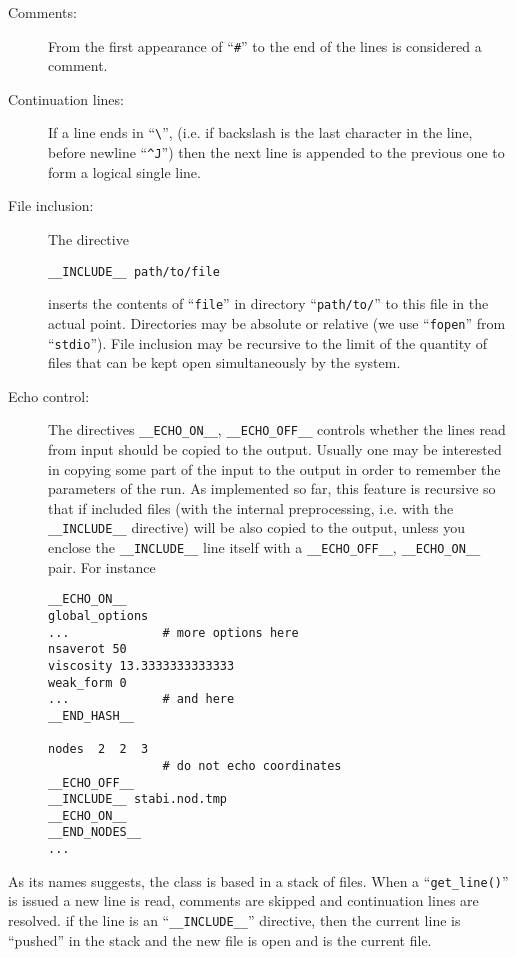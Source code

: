 \begin{description}

\item[Comments:] From the first appearance of ``\verb+#+'' to the end
of the lines is considered a comment. 

\item[Continuation lines:] If a line ends in ``\verb+\+'',
(i.e. if backslash is the last character in the line, before newline
``\verb+^J+'') then the next line is appended to the previous one to
form a logical single line. 

\item [File inclusion: ] The directive 
%
\begin{verbatim}
__INCLUDE__ path/to/file
\end{verbatim}
%
inserts the contents of ``\verb+file+'' in directory
``\verb+path/to/+'' to this file in the actual point. Directories may
be absolute or relative (we use ``\verb+fopen+'' from
``\verb+stdio+''). File inclusion may be recursive to the limit of the
quantity of files that can be kept open simultaneously by the system.

\item [Echo control: ] The directives \verb+__ECHO_ON__+,
\verb+__ECHO_OFF__+ controls whether the lines read from input should
be copied to the output. Usually one may be interested in copying some
part of the input to the output in order to remember the parameters of
the run. As implemented so far, this feature is recursive so that if
included files (with the internal preprocessing, i.e. with the
\verb+__INCLUDE__+ directive) will be also copied to the output, unless you
enclose the \verb+__INCLUDE__+ line itself with a \verb+__ECHO_OFF__+,
\verb+__ECHO_ON__+ pair. For instance

\begin{verbatim}
__ECHO_ON__
global_options
...             # more options here
nsaverot 50
viscosity 13.3333333333333
weak_form 0
...             # and here
__END_HASH__

nodes  2  2  3
                # do not echo coordinates
__ECHO_OFF__
__INCLUDE__ stabi.nod.tmp
__ECHO_ON__
__END_NODES__
...
\end{verbatim}

\end{description}


As its names suggests, the class is based in a stack of files. When a 
``\verb+get_line()+'' is issued a new line is read, comments are
skipped and continuation lines are resolved. if the line is an
``\verb+__INCLUDE__+'' directive, then the current line is ``pushed''
in the stack and the new file is open and is the current file. 


